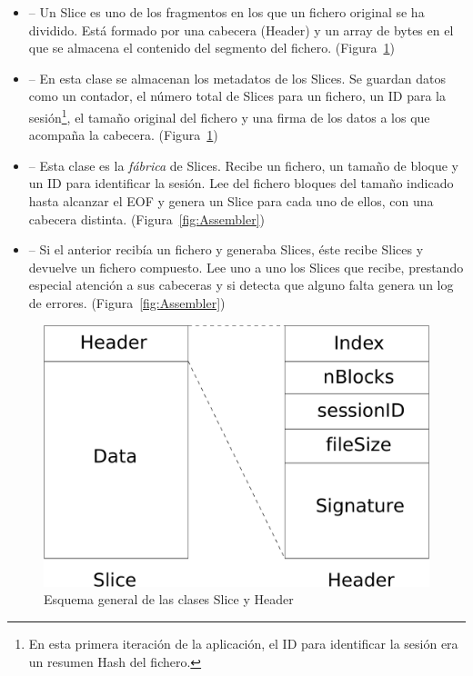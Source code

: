 \begin{itemize}
  \item {} -- Un Slice es uno de los fragmentos en los que un
  fichero original se ha dividido. Está formado por una cabecera (Header) y un
  array de bytes en el que se almacena el contenido del segmento del fichero.
  (Figura~\ref{fig:Slice_Header})

  \item {} -- En esta clase se almacenan los metadatos de los
  Slices. Se guardan datos como un contador, el número total de Slices
  para un fichero, un ID para la sesión\footnote{En esta primera iteración de la
  aplicación, el ID para identificar la sesión era un resumen Hash del fichero.},
  el tamaño original del fichero y una firma de los datos a los que acompaña la cabecera.
  (Figura~\ref{fig:Slice_Header})

  \item {} -- Esta clase es la \emph{fábrica} de Slices. Recibe
  un fichero, un tamaño de bloque y un ID para identificar la sesión. Lee del
  fichero bloques del tamaño indicado hasta alcanzar el EOF y genera un Slice
  para cada uno de ellos, con una cabecera distinta. (Figura~\ref{fig:Assembler})

  \item {} -- Si el anterior recibía un fichero y generaba Slices,
  éste recibe Slices y devuelve un fichero compuesto. Lee uno a uno los Slices
  que recibe, prestando especial atención a sus cabeceras y si detecta que
  alguno falta genera un log de errores. (Figura~\ref{fig:Assembler})
\end{itemize}

\begin{figure}[ht]
  \centering
  \includegraphics[scale=0.4]{Figures/Slice_Header}
  \decoRule
  \caption[Slice - Header]{Esquema general de las clases Slice y Header}
  \label{fig:Slice_Header}
\end{figure}

